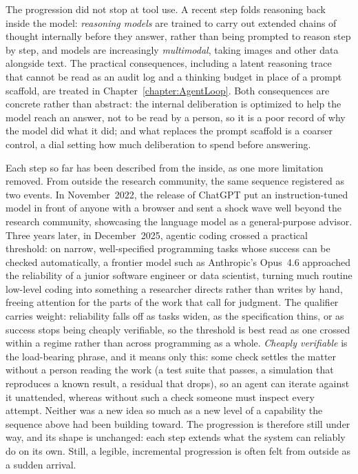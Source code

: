 The progression did not stop at tool use.
A recent step folds reasoning back inside the model: \emph{reasoning models} are trained to carry out extended chains of thought internally before they answer, rather than being prompted to reason step by step, and models are increasingly \emph{multimodal}, taking images and other data alongside text.
The practical consequences, including a latent reasoning trace that cannot be read as an audit log and a thinking budget in place of a prompt scaffold, are treated in Chapter~\ref{chapter:AgentLoop}.
Both consequences are concrete rather than abstract: the internal deliberation is optimized to help the model reach an answer, not to be read by a person, so it is a poor record of why the model did what it did; and what replaces the prompt scaffold is a coarser control, a dial setting how much deliberation to spend before answering.

Each step so far has been described from the inside, as one more limitation removed.
From outside the research community, the same sequence registered as two events.
In November~2022, the release of ChatGPT put an instruction-tuned model in front of anyone with a browser and sent a shock wave well beyond the research community, showcasing the language model as a general-purpose advisor.
Three years later, in December~2025, agentic coding crossed a practical threshold: on narrow, well-specified programming tasks whose success can be checked automatically, a frontier model such as Anthropic's Opus~4.6 approached the reliability of a junior software engineer or data scientist, turning much routine low-level coding into something a researcher directs rather than writes by hand, freeing attention for the parts of the work that call for judgment.
The qualifier carries weight: reliability falls off as tasks widen, as the specification thins, or as success stops being cheaply verifiable, so the threshold is best read as one crossed within a regime rather than across programming as a whole.
\emph{Cheaply verifiable} is the load-bearing phrase, and it means only this: some check settles the matter without a person reading the work (a test suite that passes, a simulation that reproduces a known result, a residual that drops), so an agent can iterate against it unattended, whereas without such a check someone must inspect every attempt.
Neither was a new idea so much as a new level of a capability the sequence above had been building toward.
The progression is therefore still under way, and its shape is unchanged: each step extends what the system can reliably do on its own.
Still, a legible, incremental progression is often felt from outside as a sudden arrival.

